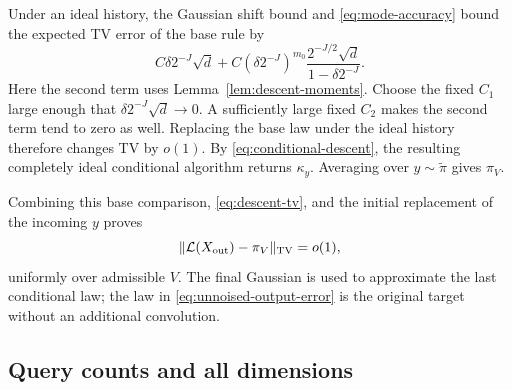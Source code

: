 Under an ideal history, the Gaussian shift bound and
\eqref{eq:mode-accuracy} bound the expected TV error of the base rule
by
\begin{equation}\label{eq:descent-base-error}
 C\delta 2^{-J}\sqrt d
 +C(\delta2^{-J})^{m_0}
                 \frac{2^{-J/2}\sqrt d}{1-\delta2^{-J}}.
\end{equation}
Here the second term uses Lemma~\ref{lem:descent-moments}.
Choose the fixed $C_1$ large enough that
$\delta2^{-J}\sqrt d\to0$. A sufficiently large fixed $C_2$
makes the second term tend to zero as well. Replacing the base law
under the ideal history therefore changes TV by $o(1)$.
By \eqref{eq:conditional-descent}, the resulting completely ideal
conditional algorithm returns $\kappa_y$. Averaging over
$y\sim\widetilde\pi$ gives $\pi_V$.

Combining this base comparison, \eqref{eq:descent-tv}, and the
initial replacement of the incoming $y$ proves
\begin{equation}\label{eq:unnoised-output-error}
            \lVert\mathcal L(X_{\rm out})-\pi_V\rVert_{\mathrm{TV}}=o(1),
\end{equation}
uniformly over admissible $V$. The final Gaussian is used to
approximate the last conditional law; the law in
\eqref{eq:unnoised-output-error} is the original target without
an additional convolution.

\subsection{Query counts and all dimensions}


